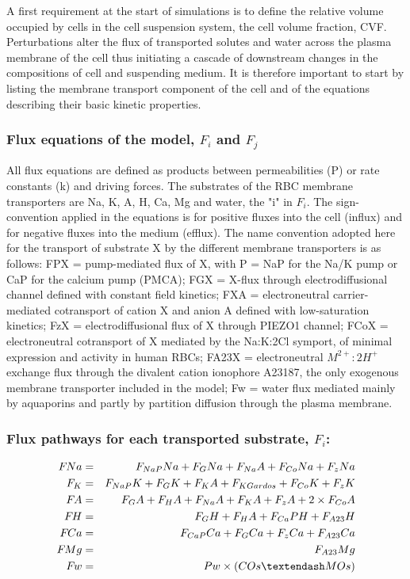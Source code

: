 \documentclass[a4paper]{article}
\newcommand{\med}[1]{M#1}
\newcommand{\cell}[1]{C#1}
\newcommand{\MOs}{\med{Os}}
\newcommand{\COs}{\cell{Os}}
\newcommand{\F}[2]{F_{#1}#2}
\begin{document}
A first requirement at the start of simulations is to define the relative volume occupied by cells in the cell suspension system, the cell volume fraction, CVF.  Perturbations alter the flux of transported solutes and water across the plasma membrane of the cell thus initiating a cascade of downstream changes in the compositions of cell and suspending medium.  It is therefore important to start by listing the membrane transport component of the cell and of the equations describing their basic kinetic properties.  

\subsubsection{Flux equations of the model, $F_i$ and $F_j$}
All flux equations are defined as products between permeabilities (P) or rate constants (k) and driving forces. The substrates of the RBC membrane transporters are Na, K, A, H, Ca, Mg and water, the "i" in $F_i$.  The sign-convention applied in the equations is for positive fluxes into the cell (influx) and for negative fluxes into the medium (efflux). The name convention adopted here for the transport of substrate X by the different membrane transporters is as follows: FPX = pump-mediated flux of X, with P = NaP for the Na/K pump or CaP for the calcium pump (PMCA); FGX = X-flux through electrodiffusional channel defined with constant field kinetics; FXA = electroneutral carrier-mediated cotransport of cation X and anion A defined with low-saturation kinetics; FzX = electrodiffusional flux of X through PIEZO1 channel; FCoX = electroneutral cotransport of X mediated by the Na:K:2Cl symport, of minimal expression and activity in human RBCs; FA23X = electroneutral $M^{2+}:2H^+$ exchange flux through the divalent cation ionophore A23187, the only exogenous membrane transporter included in the model; Fw = water flux mediated mainly by aquaporins and partly by partition diffusion through the plasma membrane.  

\setcounter{equation}{0}
\renewcommand{\theequation}{10.\alph{equation}}

\subsubsection{Flux pathways for each transported substrate, $F_i$:}
\begin{eqnarray}
\F{}{Na} &=& \F{NaP}{Na} + \F{G}{Na} + \F{Na}{A} + \F{Co}{Na} + \F{z}{Na}\\
\F{K} &=& \F{NaP}{K} + \F{G}{K} + \F{K}{A} + \F{KGardos} + \F{Co}{K} + \F{z}{K}\\
\F{}{A} &=& \F{G}{A} + \F{H}{A} + \F{Na}{A} + \F{K}{A} + \F{z}{A} + 2\times\F{Co}{A}\\
\F{}{H} &=& \F{G}{H} + \F{H}{A} + \F{Ca}{PH} + \F{A23}{H} \\
\F{}{Ca} &=& \F{CaP}{Ca} + \F{G}{Ca} + \F{z}{Ca} + \F{A23}{Ca} \\
\F{}{Mg} &=& \F{A23}{Mg} \\
\F{}{w}  &=& Pw\times (\COs – \MOs)
\end{eqnarray}
\end{document}
